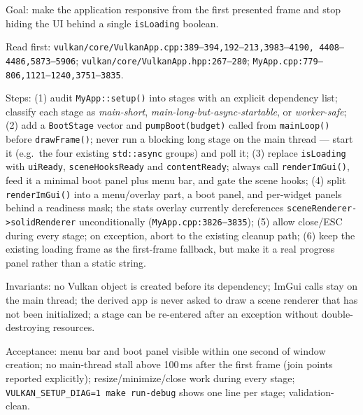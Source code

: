 \documentclass[11pt,a4paper]{article}
\begin{document}
\begin{tcolorbox}[promptbox={Prompt 1 --- Staged boot scheduler with ImGui from frame zero}]
Goal: make the application responsive from the first presented frame and
stop hiding the UI behind a single \texttt{isLoading} boolean.

Read first: \texttt{vulkan/core/VulkanApp.cpp:389--394,192--213,3983--4190,
4408--4486,5873--5906}; \texttt{vulkan/core/VulkanApp.hpp:267--280};
\texttt{MyApp.cpp:779--806,1121--1240,3751--3835}.

Steps: (1) audit \texttt{MyApp::setup()} into stages with an explicit
dependency list; classify each stage as \emph{main-short},
\emph{main-long-but-async-startable}, or \emph{worker-safe}; (2) add a
\texttt{BootStage} vector and \texttt{pumpBoot(budget)} called from
\texttt{mainLoop()} before \texttt{drawFrame()}; never run a blocking long
stage on the main thread --- start it (e.g.\ the four existing
\texttt{std::async} groups) and poll it; (3) replace \texttt{isLoading} with
\texttt{uiReady}, \texttt{sceneHooksReady} and \texttt{contentReady}; always
call \texttt{renderImGui()}, feed it a minimal boot panel plus menu bar, and
gate the scene hooks; (4) split \texttt{renderImGui()} into a menu/overlay
part, a boot panel, and per-widget panels behind a readiness mask; the stats
overlay currently dereferences \texttt{sceneRenderer->solidRenderer}
unconditionally (\texttt{MyApp.cpp:3826--3835}); (5) allow close/ESC during
every stage; on exception, abort to the existing cleanup path; (6) keep the
existing loading frame as the first-frame fallback, but make it a real
progress panel rather than a static string.

Invariants: no Vulkan object is created before its dependency; ImGui calls
stay on the main thread; the derived app is never asked to draw a scene
renderer that has not been initialized; a stage can be re-entered after an
exception without double-destroying resources.

Acceptance: menu bar and boot panel visible within one second of window
creation; no main-thread stall above 100\,ms after the first frame (join
points reported explicitly); resize/minimize/close work during every stage;
\texttt{VULKAN\_SETUP\_DIAG=1 make run-debug} shows one line per stage;
validation-clean.
\end{tcolorbox}
\end{document}

